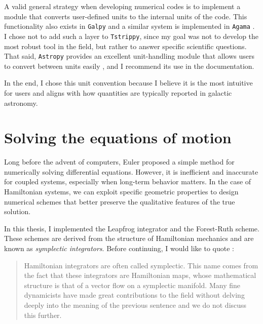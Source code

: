     A valid general strategy when developing numerical codes is to implement a module that converts user-defined units to the internal units of the code. This functionality also exists in \texttt{Galpy} and a similar system is implemented in \texttt{Agama} \citep{2018arXiv180208255V}. I chose not to add such a layer to \texttt{Tstrippy}, since my goal was not to develop the most robust tool in the field, but rather to answer specific scientific questions. That said, \texttt{Astropy} provides an excellent unit-handling module that allows users to convert between units easily \citep{2013A&A...558A..33A}, and I recommend its use in the documentation. 

    In the end, I chose this unit convention because I believe it is the most intuitive for users and aligns with how quantities are typically reported in galactic astronomy.


\section{Solving the equations of motion}

    Long before the advent of computers, Euler proposed a simple method for numerically solving differential equations. However, it is inefficient and inaccurate for coupled systems, especially when long-term behavior matters. In the case of Hamiltonian systems, we can exploit specific geometric properties to design numerical schemes that better preserve the qualitative features of the true solution.

    In this thesis, I implemented the Leapfrog integrator and the Forest-Ruth scheme. These schemes are derived from the structure of Hamiltonian mechanics and are known as \textit{symplectic integrators}. Before continuing, I would like to quote \citep{bovy_inprep}:

    \begin{quote}
        Hamiltonian integrators are often called symplectic. This name comes from the fact that these integrators are Hamiltonian maps, whose mathematical structure is that of a vector flow on a symplectic manifold. Many fine dynamicists have made great contributions to the field without delving deeply into the meaning of the previous sentence and we do not discuss this further.
    \end{quote}

